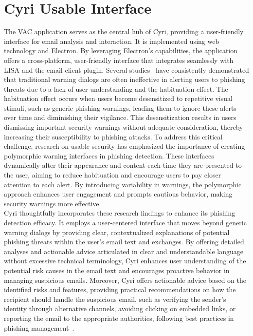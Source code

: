 \section{Cyri Usable Interface }
\label{sec:ui}
The VAC application serves as the central hub of Cyri, providing a user-friendly interface for email analysis and interaction. It is implemented using web technology and Electron. 
By leveraging Electron’s capabilities, the application offers a cross-platform, user-friendly interface that integrates seamlessly with LISA and the email client plugin.
Several studies~\cite{b22, b23, b36} have consistently demonstrated that traditional warning dialogs are often ineffective in alerting users to phishing threats due to a lack of user understanding and the habituation effect. The habituation effect occurs when users become desensitized to repetitive visual stimuli, such as generic phishing warnings, leading them to ignore these alerts over time and diminishing their vigilance. This desensitization results in users dismissing important security warnings without adequate consideration, thereby increasing their susceptibility to phishing attacks.
To address this critical challenge, research on usable security has emphasized the importance of creating polymorphic warning interfaces in phishing detection. These interfaces dynamically alter their appearance and content each time they are presented to the user, aiming to reduce habituation and encourage users to pay closer attention to each alert. By introducing variability in warnings, the polymorphic approach enhances user engagement and prompts cautious behavior, making security warnings more effective.\\
Cyri thoughtfully incorporates these research findings to enhance its phishing detection efficacy. It employs a user-centered interface that moves beyond generic warning dialogs by providing clear, contextualized explanations of potential phishing threats within the user's email text and exchanges. By offering detailed analyses and actionable advice articulated in clear and understandable language without excessive technical terminology, Cyri enhances user understanding of the potential risk causes in the email text and encourages proactive behavior in managing suspicious emails. Moreover, Cyri offers actionable advice based on the identified risks and features, providing practical recommendations on how the recipient should handle the suspicious email, such as verifying the sender's identity through alternative channels, avoiding clicking on embedded links, or reporting the email to the appropriate authorities, following best practices in phishing management~\cite{b22}.
